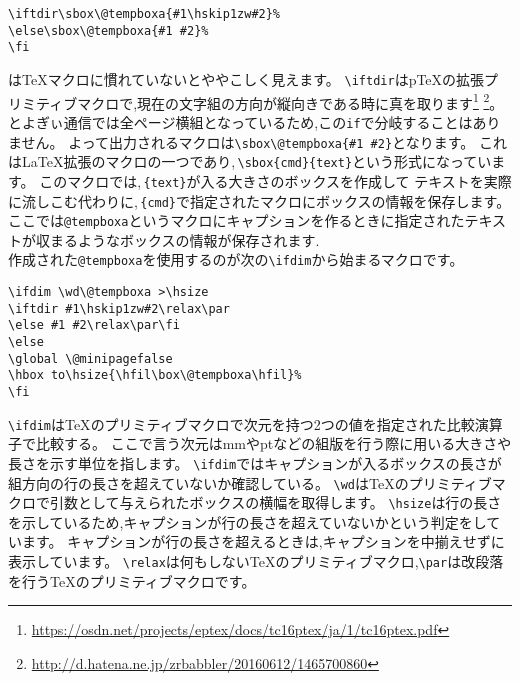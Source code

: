 \begin{verbatim}
\iftdir\sbox\@tempboxa{#1\hskip1zw#2}%
\else\sbox\@tempboxa{#1 #2}%
\fi
\end{verbatim}%
は{\TeX}マクロに慣れていないとややこしく見えます。
\verb|\iftdir|は{p\TeX}の拡張プリミティブマクロで,現在の文字組の方向が縦向きである時に真を取ります\footnote{\url{https://osdn.net/projects/eptex/docs/tc16ptex/ja/1/tc16ptex.pdf}}
\footnote{\url{http://d.hatena.ne.jp/zrbabbler/20160612/1465700860}}。
とよぎぃ通信では全ページ横組となっているため,この\verb|if|で分岐することはありません。
よって出力されるマクロは\verb|\sbox\@tempboxa{#1 #2}|となります。
これは{\LaTeX}拡張のマクロの一つであり,\,\verb|\sbox{cmd}{text}|という形式になっています。
このマクロでは,\,\verb|{text}|が入る大きさのボックスを作成して
テキストを実際に流しこむ代わりに,\,\verb|{cmd}|で指定されたマクロにボックスの情報を保存します。
ここでは\verb|@tempboxa|というマクロにキャプションを作るときに指定されたテキストが収まるようなボックスの情報が保存されます.\\
作成された\verb|@tempboxa|を使用するのが次の\verb|\ifdim|から始まるマクロです。

\begin{verbatim}
\ifdim \wd\@tempboxa >\hsize
\iftdir #1\hskip1zw#2\relax\par
\else #1 #2\relax\par\fi
\else
\global \@minipagefalse
\hbox to\hsize{\hfil\box\@tempboxa\hfil}%
\fi
\end{verbatim}
\verb|\ifdim|は{\TeX}のプリミティブマクロで次元を持つ2つの値を指定された比較演算子で比較する。
ここで言う次元はmmやptなどの組版を行う際に用いる大きさや長さを示す単位を指します。
\verb|\ifdim|ではキャプションが入るボックスの長さが組方向の行の長さを超えていないか確認している。
\verb|\wd|は{\TeX}のプリミティブマクロで引数として与えられたボックスの横幅を取得します。
\verb|\hsize|は行の長さを示しているため,キャプションが行の長さを超えていないかという判定をしています。
キャプションが行の長さを超えるときは,キャプションを中揃えせずに表示しています。
\verb|\relax|は何もしない{\TeX}のプリミティブマクロ,\verb|\par|は改段落を行う{\TeX}のプリミティブマクロです。

